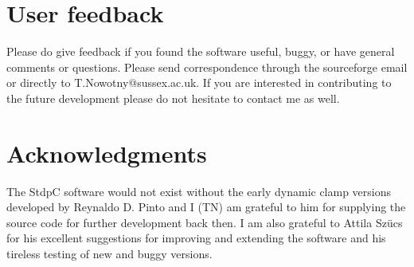 \documentclass{article}
\begin{document}
\section{User feedback} 
Please do give feedback if you found the software useful, buggy, or
have general comments or questions. Please send correspondence through
the sourceforge email or directly to T.Nowotny@sussex.ac.uk.
If you are interested in contributing to the future development please
do not hesitate to contact me as well.  
 
\section{Acknowledgments} 
 
The StdpC software would not exist without the early dynamic clamp
versions developed by Reynaldo D. Pinto and I (TN) am grateful to him for supplying the source code for further
development back then. I am also grateful to Attila Sz\"ucs for his excellent
suggestions for improving and extending the software and his tireless
testing of new and buggy versions.



\end{document}

